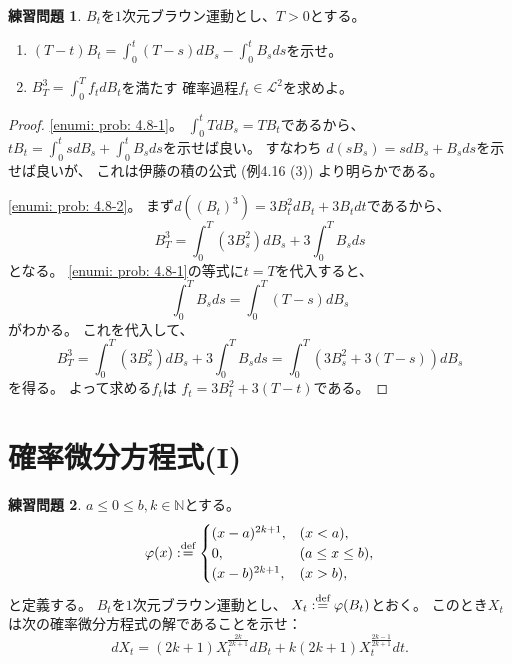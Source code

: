 \documentclass[uplatex]{jsarticle}
\theoremstyle{definition}
\newtheorem{prob}[prob]{練習問題}
\def\N{\mathbb{N}}
\def\mcL{\mathcal{L}}
\def\dfn{:\overset{\mbox{{\scriptsize def}}}{=}}
\begin{document}
\begin{prob}\label{prob: 4.8}
  \(B_t\)を\(1\)次元ブラウン運動とし、\(T > 0\)とする。
  \begin{enumerate}
    \item \label{enumi: prob: 4.8-1}
    \((T-t)B_t = \int_0^t(T-s)dB_s - \int_0^tB_sds\)を示せ。
    \item \label{enumi: prob: 4.8-2}
    \(B_T^3 = \int_0^T f_tdB_t\)を満たす
    確率過程\(f_t\in \mcL^2\)を求めよ。
  \end{enumerate}
\end{prob}

\begin{proof}
  \ref{enumi: prob: 4.8-1}。
  \(\int_0^tTdB_s = TB_t\)であるから、
  \(tB_t = \int_0^tsdB_s + \int_0^tB_sds\)を示せば良い。
  すなわち
  \(d(sB_s) = sdB_s + B_sds\)を示せば良いが、
  これは伊藤の積の公式 (例4.16 (3)) より明らかである。

  \ref{enumi: prob: 4.8-2}。
  まず\(d((B_t)^3) = 3B_t^2dB_t + 3B_tdt\)であるから、
  \[
  B_T^3 = \int_0^T(3B_s^2)dB_s + 3\int_0^TB_sds
  \]
  となる。
  \ref{enumi: prob: 4.8-1}の等式に\(t=T\)を代入すると、
  \[
  \int_0^TB_sds = \int_0^T(T-s)dB_s
  \]
  がわかる。
  これを代入して、
  \[
  B_T^3 = \int_0^T(3B_s^2)dB_s + 3\int_0^TB_sds
  = \int_0^T(3B_s^2 + 3(T-s)) dB_s
  \]
  を得る。
  よって求める\(f_t\)は
  \(f_t = 3B_t^2 + 3(T-t)\)である。
\end{proof}















\newpage
\section{確率微分方程式(I)}


\begin{prob}\label{prob: 5.1}
  \(a\leq 0 \leq b , k\in \N\)とする。
  \[
  \varphi(x) \dfn
  \begin{cases}
    (x-a)^{2k+1}, &(x < a), \\
    0 , &(a \leq x \leq b), \\
    (x-b)^{2k+1}, &(x > b),
  \end{cases}
  \]
  と定義する。
  \(B_t\)を\(1\)次元ブラウン運動とし、
  \(X_t \dfn \varphi(B_t)\)とおく。
  このとき\(X_t\)は次の確率微分方程式の解であることを示せ：
  \[
  dX_t = (2k+1)X_t^{\frac{2k}{2k+1}}dB_t + k(2k+1)X_t^{\frac{2k-1}{2k+1}}dt.
  \]
\end{prob}
\end{document}
